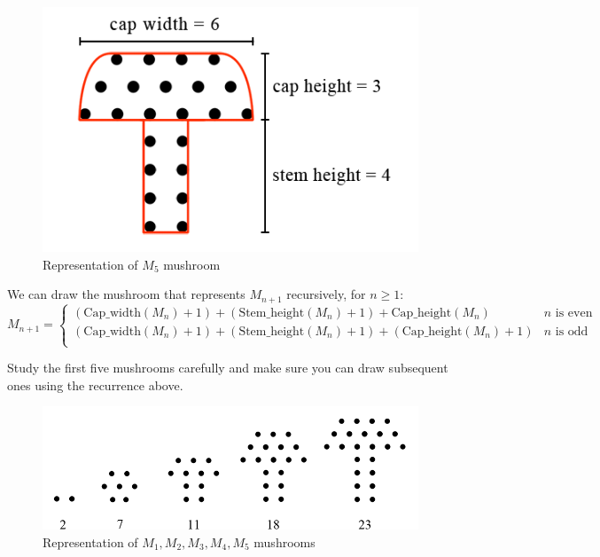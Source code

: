 \documentclass[addpoints]{exam}
\begin{document}
\begin{questions}
\begin{figure}[h]
  \centering
  \includegraphics[scale=1.0]{m5_figurate.png}
  \caption{Representation of $M_5$ mushroom}
  \label{fig:mushroom_anatomy}
\end{figure}

We can draw the mushroom that represents $M_{n+1}$ recursively, for $n \geq 1$:
\[ 
    M_{n+1}=
    \begin{cases} 
      (\textrm{Cap\_width}(M_n) + 1) + (\textrm{Stem\_height}(M_n) + 1) + \textrm{Cap\_height}(M_n)  & n \textrm{ is even} \\
      (\textrm{Cap\_width}(M_n) + 1) + (\textrm{Stem\_height}(M_n) + 1)  + (\textrm{Cap\_height}(M_n)+1) & n \textrm{ is odd}  \\      
   \end{cases}
\]

Study the first five mushrooms carefully and make sure you can draw subsequent ones using the recurrence above.

\begin{figure}[h]
  \centering
  \includegraphics{mushroom_series.png}
  \caption{Representation of $M_1,M_2,M_3,M_4,M_5$ mushrooms}
  \label{fig:mushroom_anatomy}
\end{figure}

  \begin{parts}

\end{parts}
\end{questions}
\end{document}
